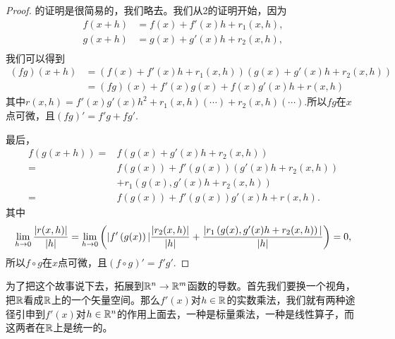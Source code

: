 \documentclass[11pt]{extbook}
\theoremstyle{plain}%
\begin{document}
\begin{proof}
	的证明是很简易的，我们略去。我们从2的证明开始，因为
	\[
		\begin{split}
			f(x+h)&=f(x)+f'(x)h+r_1(x,h),\\
			g(x+h)&=g(x)+g'(x)h+r_2(x,h),\\
		\end{split}
	\]
	我们可以得到
	\[
		\begin{split}
			(fg)(x+h)&=\left(f(x)+f'(x)h+r_1(x,h)\right)\left(g(x)+g'(x)h+r_2(x,h)\right)\\
			&=(fg)(x)+f'(x)g(x)+f(x)g'(x)h+r(x,h)
		\end{split}
	\]
	其中$r(x,h)=f'(x)g'(x)h^2+r_1(x,h)\left(\cdots\right)+r_2(x,h)\left(\cdots\right)$.所以$fg$在$x$点可微，且$(fg)'=f'g+fg'$.

	最后，
	\[
		\begin{split}
			f\left(g\left(x+h\right)\right)=&f\left(g(x)+g'(x)h+r_2(x,h)\right)\\
			=&f\left(g\left(x\right)\right)+f'\left(g(x)\right)(g'(x)h+r_2(x,h))\\
			&+r_1\left(g(x),g'(x)h+r_2(x,h)\right)\\
			=&f\left(g\left(x\right)\right)+f'\left(g(x)\right)g'(x)h+r(x,h).
		\end{split}
	\]
	其中
	\[
		\lim_{h\to 0}\frac{\arrowvert r(x,h) \arrowvert}{\arrowvert h \arrowvert}=
		\lim_{h\to 0}\left(\arrowvert f'\left(g(x)\right)\arrowvert\frac{\arrowvert r_2(x,h) \arrowvert}{\arrowvert h \arrowvert}+\frac{\arrowvert r_1\left(g(x),g'(x)h+r_2(x,h)\right) \arrowvert}{\arrowvert h \arrowvert}\right)=0,
	\]
	所以$f\circ g$在$x$点可微，且$(f\circ g)'=f'g'$.
\end{proof}
为了把这个故事说下去，拓展到$\mathbb{R}^n\to \mathbb{R}^m$函数的导数。首先我们要换一个视角，把$\mathbb{R}$看成$\mathbb{R}$上的一个矢量空间。那么$f'(x)$对$h\in \mathbb{R}$的实数乘法，我们就有两种途径引申到$f'(x)$对$h\in \mathbb{R}^n$的作用上面去，一种是标量乘法，一种是线性算子，而这两者在$\mathbb{R}$上是统一的。
\end{document}
